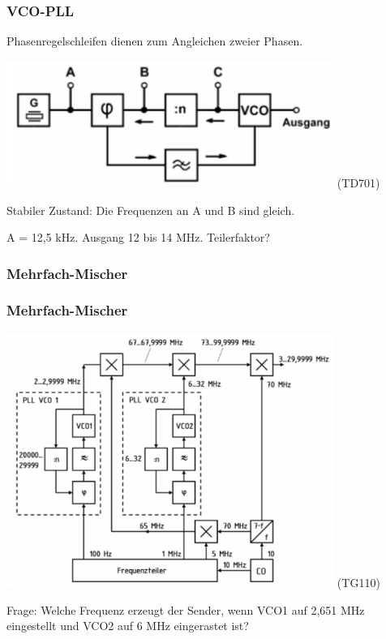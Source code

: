 \begin{frame}
    \frametitle{VCO-PLL}

    Phasenregelschleifen dienen zum Angleichen zweier Phasen.

    \begin{center}
        \includegraphics[width=0.8\textwidth]{a13/TD701.png}
        \tiny (TD701)
    \end{center}

    Stabiler Zustand: Die Frequenzen an A und B sind gleich.

    A = 12,5 kHz. Ausgang 12 bis 14 MHz. Teilerfaktor?

\end{frame}

\subsubsection{Mehrfach-Mischer}

\begin{frame}
    \frametitle{Mehrfach-Mischer}


    \begin{center}
        \includegraphics[width=0.8\textwidth]{a13/TG110.png}
        \tiny (TG110)
    \end{center}

    Frage: Welche Frequenz erzeugt der Sender, wenn VCO1 auf 2,651 MHz
    eingestellt und VCO2 auf 6 MHz eingerastet ist? 

\end{frame}

